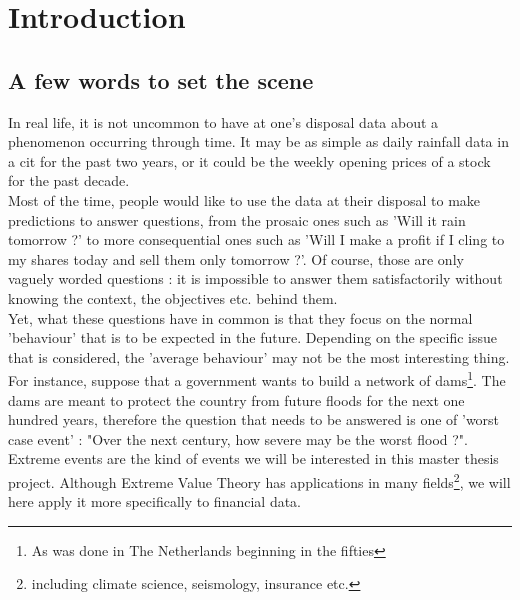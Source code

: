 \chapter{Introduction}
 \section{A few words to set the scene}
In real life, it is not uncommon to have at one's disposal data about a phenomenon occurring through time. It may be as simple as daily rainfall data in a cit for the past two years, or it could be the weekly opening prices of a stock for the past decade. \\[4 pt]
Most of the time, people would like to use the data at their disposal to make predictions to answer questions, from the prosaic ones such as 'Will it rain tomorrow ?' to more consequential ones such as 'Will I make a profit if I cling to my shares today and sell them only tomorrow ?'. Of course, those are only vaguely worded questions : it is impossible to answer them satisfactorily without knowing the context, the objectives etc. behind them. \\[4 pt]
Yet, what these questions have in common is that they focus on the normal 'behaviour' that is to be expected in the future. Depending on the specific issue that is considered, the 'average behaviour' may not be the most interesting thing. For instance, suppose that a government wants to build a network of dams\footnote{As was done in The Netherlands beginning in the fifties}. The dams are meant to protect the country from future floods for the next one hundred years, therefore the question that needs to be answered is one of 'worst case event' : "Over the next century, how severe may be the worst flood ?". \\[4 pt]
Extreme events are the kind of events we will be interested in this master thesis project. Although Extreme Value Theory has applications in many fields\footnote{including climate science, seismology, insurance etc.}, we will here apply it more specifically to financial data.

